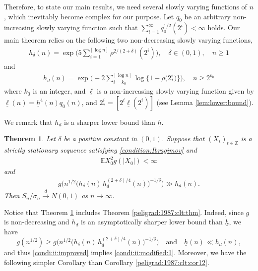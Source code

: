 \documentclass[11pt,a4,leqno]{amsart}
\newtheorem{theorem}[lemma]{Theorem}
\newcommand{\ud}{\underline}
\newcommand{\Z}{{\mathbb Z}}
\newcommand{\E }{{\mathbb E}}
\newcommand{\1}{{\mathbf 1}}
\begin{document}
Therefore, to state our main results, we need several slowly varying functions of $n$, which
 inevitably become complex for our purpose. 
Let $q_0$ 
be an arbitrary non-increasing slowly varying function such that 
$\sum_{i=1}^\infty q_0^{1/2}(2^i)< \infty$ holds. 
Our main theorem relies on the following two non-decreasing slowly varying functions,  
\begin{align*}
 h_\delta (n) = \exp\Big(5 \sum_{i=1}^{[\log n]} \rho^{2/(2+\delta)}(2^{i})\Big),\quad \delta\in(0,1),\quad n\ge 1
\end{align*}
and 
\begin{align*}
 h_d (n) = \exp\Big(- 2\sum_{i=k_0}^{[\log n]} \log \big\{ 1-
\rho\big(2_\ast^i \big) \big\}
\Big), \quad n\ge 2^{k_0} 
\end{align*}
where 
$k_0$ is an integer, 
and $\ud \ell$ is  
a non-increasing slowly varying function given 
by $\ud \ell(n)= \ud h^4(n) q_0(n)$, and $2_\ast^i=[2^i \ud \ell(2^i)]$ (see Lemma \ref{lem:lower:bound}).  

We remark that $h_d$ is a sharper lower bound than $\ud h$.
\begin{theorem}
\label{thm:main1}
Let $\delta$ be a positive constant in $(0,1)$. 
 Suppose that $(X_t)_{t\in \Z}$ is a strictly stationary sequence satisfying \eqref{condition:Ibragimov} and 
\begin{align*}
 \E X_0^2 g(|X_0|)<\infty
\end{align*}
and 
\begin{align}
\label{condi:ii:improved}
 g\Big(n^{1/2} \big(h_\delta(n)\, h_d^{(2+\delta)/4}(n) \big)^{-1/\delta}\Big) \gg h_d(n). 
\end{align}
Then $S_n/\sigma_n\stackrel{d}{\to} N(0,1)$ as $n\to\infty$.
\end{theorem}

Notice that Theorem \ref{thm:main1} includes Theorem \ref{peligrad:1987:clt:thm}.
Indeed, since $g$ is non-decreasing and $h_d$ is an asymptotically sharper lower bound than $\ud h$, we have 
\[
g(n^{1/2}) \ge g\Big(n^{1/2} \big(h_\delta(n)\, h_d^{(2+\delta)/4}(n) \big)^{-1/\delta}\Big)\quad 
\text{and}\quad 
\ud h(n) \ll h_d(n), 
\]
and thus \eqref{condi:ii:improved} implies \eqref{condi:ii:modified:1}.
Moreover, we have the following simpler Corollary than Corollary \ref{peligrad:1987:clt:cor12}. 
\end{document}
